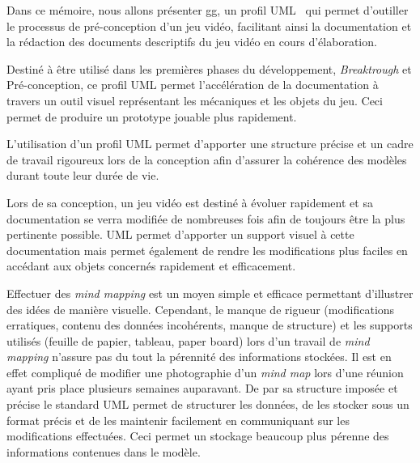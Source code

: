




Dans ce mémoire, nous allons pr\'esenter \gls{gg}, un profil UML~\cite{ReferenceBibliographique} qui permet d'outiller le processus de pré-conception d'un jeu vidéo, facilitant ainsi la documentation et la rédaction des documents descriptifs du jeu vidéo en cours d'élaboration.

Destiné à être utilisé dans les premières phases du développement, \emph{Breaktrough} et Pré-conception, ce profil UML permet l'accélération de la documentation à travers un outil visuel représentant les mécaniques et les objets du jeu. Ceci permet de produire un prototype jouable plus rapidement.

L'utilisation d'un profil UML permet d'apporter une structure précise et un cadre de travail rigoureux lors de la conception afin d'assurer la cohérence des modèles durant toute leur durée de vie.



Lors de sa conception, un jeu vidéo est destiné à évoluer rapidement et sa documentation se verra modifiée de nombreuses fois afin de toujours être la plus pertinente possible. UML permet d'apporter un support visuel à cette documentation mais permet également de rendre les modifications plus faciles en accédant aux objets concernés rapidement et efficacement. 


Effectuer des \emph{mind mapping} est un moyen simple et efficace permettant d'illustrer des idées de manière visuelle. Cependant, le manque de rigueur (modifications erratiques, contenu des données incohérents, manque de structure) et les supports utilisés (feuille de papier, tableau, paper board) lors d'un travail de \emph{mind mapping} n'assure pas du tout la pérennité des informations stockées. Il est en effet compliqué de modifier une photographie d'un \emph{mind map} lors d'une réunion ayant pris place plusieurs semaines auparavant. De par sa structure imposée et précise le standard UML permet de structurer les données, de les stocker sous un format précis et de les maintenir facilement en communiquant sur les modifications effectuées. Ceci permet un stockage beaucoup plus pérenne des informations contenues dans le modèle.


